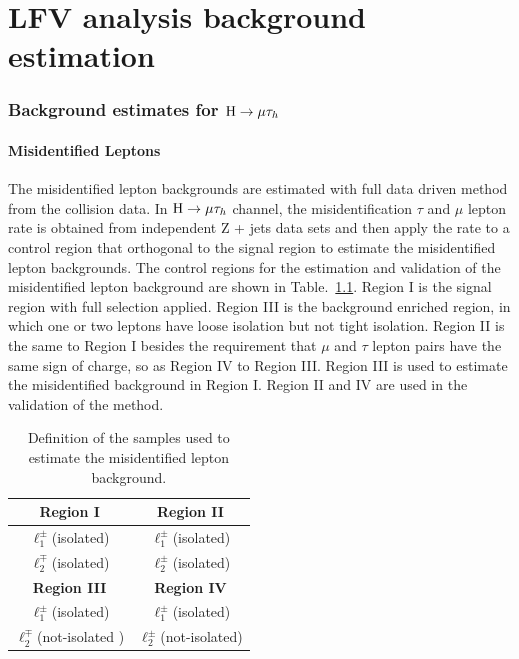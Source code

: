 \chapter{LFV analysis background estimation}

\subsection{Background estimates for $\mathrm{H}\to \mu\tau_{h}$}


\subsubsection{Misidentified Leptons}

The misidentified lepton backgrounds are estimated with full data driven method from the collision data. In $\mathrm{H}\to \mu\tau_{h}$ channel, the misidentification $\tau$ and $\mu$ lepton rate is obtained from independent Z + jets data sets and then apply the rate to a control region that orthogonal to the signal region to estimate the misidentified lepton backgrounds.  The control regions for the estimation and validation of the misidentified lepton background are shown in Table.~\ref{tab:fakeratediagram}. Region I is the signal region with full selection applied. Region III is the background enriched region, in which one or two leptons have loose isolation but not tight isolation. Region II is the same to Region I besides the requirement that $\mu$ and $\tau$ lepton pairs have the same sign of charge, so as Region IV to Region III. Region III is used to estimate the misidentified background in Region I. Region II and IV are used in the validation of the method. 


\begin{table}[hbt]
 \centering
 {
 \renewcommand{\arraystretch}{1.1}
 \caption{Definition of the samples used to estimate the misidentified lepton background.}
  \label{tab:fakeratediagram}
  \begin{tabular}{c|c} \hline
\textbf{Region I}              &  \textbf{Region II}             \\ \hline
$\ell^{\pm}_{1}$(isolated)  &  $\ell^{\pm}_{1}$(isolated)             \\
$\ell^{\mp}_{2}$(isolated)  &  $\ell^{\pm}_{2}$(isolated)             \\

\hline \hline
\textbf{Region III}           &  \textbf{Region IV}             \\ \hline
$\ell^{\pm}_{1}$(isolated)  &  $\ell^{\pm}_{1}$(isolated)             \\
$\ell^{\mp}_{2}$(not-isolated )  &  $\ell^{\pm}_{2}$(not-isolated)             \\
\hline
  \end{tabular}
}
\end{table}



